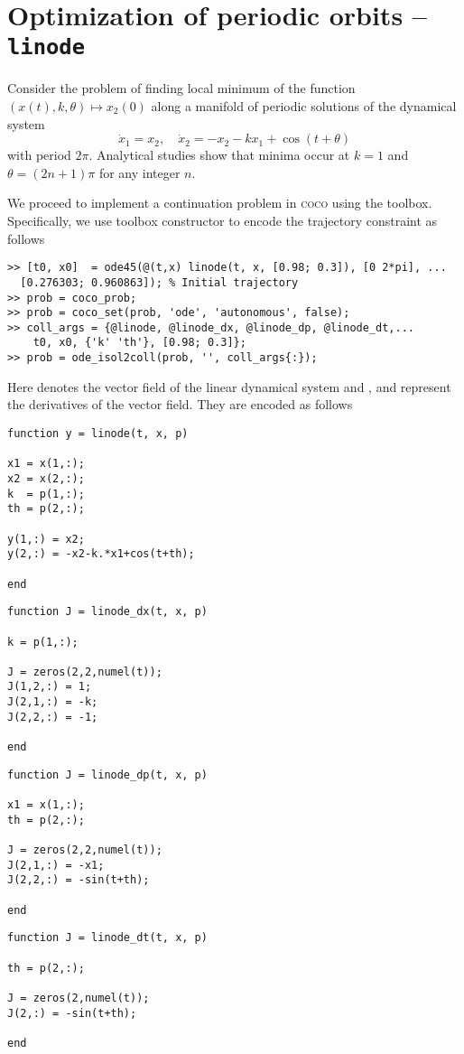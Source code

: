 \section{Optimization of periodic orbits  -- \texttt{linode}}
\label{sec:linode}
Consider the problem of finding local minimum of the function $(x(t),k,\theta)\mapsto x_2(0)$ along a manifold of periodic solutions of the dynamical system
\begin{equation}
\dot{x}_1=x_2,\quad \dot{x}_2=-x_2-kx_1+\cos(t+\theta)
\end{equation}
with period $2\pi$. Analytical studies show that minima occur at $k=1$ and $\theta=(2n+1)\pi$ for any integer $n$.

We proceed to implement a continuation problem in \textsc{coco} using the  toolbox. Specifically, we use  toolbox constructor to encode the trajectory constraint as follows
\begin{lstlisting}[language=coco-highlight]
>> [t0, x0]  = ode45(@(t,x) linode(t, x, [0.98; 0.3]), [0 2*pi], ...
  [0.276303; 0.960863]); % Initial trajectory
>> prob = coco_prob;
>> prob = coco_set(prob, 'ode', 'autonomous', false);
>> coll_args = {@linode, @linode_dx, @linode_dp, @linode_dt,...
    t0, x0, {'k' 'th'}, [0.98; 0.3]};
>> prob = ode_isol2coll(prob, '', coll_args{:});
\end{lstlisting}
Here  denotes the vector field of the linear dynamical system and ,  and  represent the derivatives of the vector field. They are encoded as follows
\begin{lstlisting}[language=coco-highlight]
function y = linode(t, x, p)

x1 = x(1,:);
x2 = x(2,:);
k  = p(1,:);
th = p(2,:);

y(1,:) = x2;
y(2,:) = -x2-k.*x1+cos(t+th);

end
\end{lstlisting}
\begin{lstlisting}[language=coco-highlight]
function J = linode_dx(t, x, p) 

k = p(1,:);

J = zeros(2,2,numel(t));
J(1,2,:) = 1;
J(2,1,:) = -k;
J(2,2,:) = -1;

end
\end{lstlisting}
\begin{lstlisting}[language=coco-highlight]
function J = linode_dp(t, x, p)

x1 = x(1,:);
th = p(2,:);

J = zeros(2,2,numel(t));
J(2,1,:) = -x1;
J(2,2,:) = -sin(t+th);

end
\end{lstlisting}
\begin{lstlisting}[language=coco-highlight]
function J = linode_dt(t, x, p)

th = p(2,:);

J = zeros(2,numel(t));
J(2,:) = -sin(t+th);

end
\end{lstlisting}

